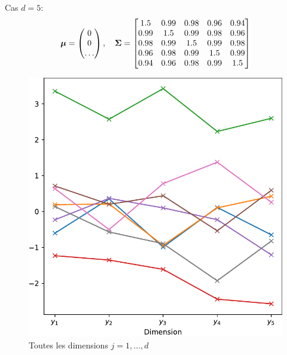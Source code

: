 \documentclass[xcolor=svgnames, t]{beamer}
\newcommand{\vectorx}[1]{\boldsymbol{\MakeLowercase{\mathbf{#1}}}}
\newcommand{\matrixx}[1]{\boldsymbol{\MakeUppercase{#1}}}
\begin{document}
\begin{frame}
  Cas $d=5$:
  \begin{equation*}
    \vectorx{\mu}
    =
    \begin{pmatrix}
      0 \\
      0 \\
      \dots
    \end{pmatrix},
    \quad
    \matrixx{\Sigma}
    =
    \begin{bmatrix}
      1.5 & 0.99 & 0.98 & 0.96 & 0.94 \\
      0.99 & 1.5 & 0.99 & 0.98 & 0.96 \\
      0.98 & 0.99 & 1.5 & 0.99 & 0.98 \\
      0.96 & 0.98 & 0.99 & 1.5 & 0.99 \\
      0.94 & 0.96 & 0.98 & 0.99 & 1.5
      \end{bmatrix}
  \end{equation*}
  \begin{figure}[ht]
    \includegraphics[scale=0.4]{gaussian_nd_valuevsindex.pdf}
    \caption{Toutes les dimensions $j=1, \dots, d$}
  \end{figure}
\end{frame}

\section[short]{}
\end{document}
